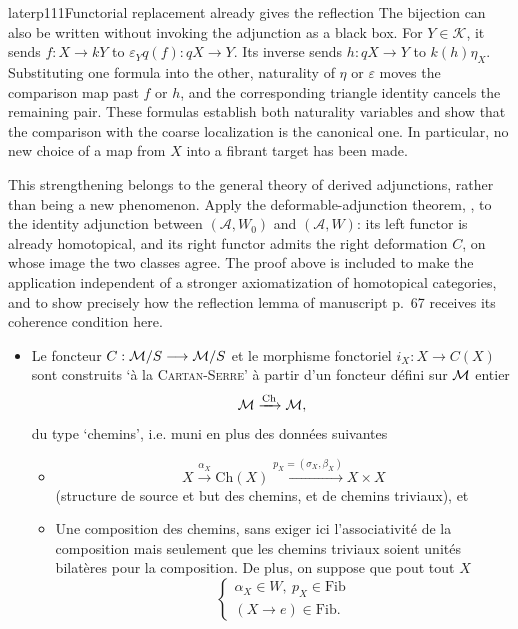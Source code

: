 \begin{dcomment}{later}{p111}{Functorial replacement already gives the reflection}
The bijection can also be written without invoking the adjunction as a black box. For $Y\in\mathcal K$, it sends $f:X\to kY$ to $\varepsilon_Yq(f):qX\to Y$. Its inverse sends $h:qX\to Y$ to $k(h)\eta_X$. Substituting one formula into the other, naturality of $\eta$ or $\varepsilon$ moves the comparison map past $f$ or $h$, and the corresponding triangle identity cancels the remaining pair. These formulas establish both naturality variables and show that the comparison with the coarse localization is the canonical one. In particular, no new choice of a map from $X$ into a fibrant target has been made.

This strengthening belongs to the general theory of derived adjunctions, rather than being a new phenomenon. Apply the deformable-adjunction theorem, \citet[Theorem~2.2.11]{Riehl2014}, to the identity adjunction between $(\mathcal A,W_0)$ and $(\mathcal A,W)$: its left functor is already homotopical, and its right functor admits the right deformation $C$, on whose image the two classes agree. The proof above is included to make the application independent of a stronger axiomatization of homotopical categories, and to show precisely how the reflection lemma of manuscript p.~67 receives its coherence condition here.
\end{dcomment}


\begin{itemize}[leftmargin=3em]
\item[A$'$)] Le foncteur $C : \mathcal{M}/S \longrightarrow \mathcal{M}/S$ et le morphisme fonctoriel $i_X : X \longrightarrow C(X)$ sont construits ‘à la \textsc{Cartan-Serre}’ à partir d'un foncteur défini sur $\mathcal{M}$ entier
\[\mathcal{M} \xrightarrow{\mathrm{Ch}} \mathcal{M},\]
du type ‘chemins’, i.e. muni en plus des données suivantes
\begin{itemize}[leftmargin=3em]
\item[a)] \[X \xrightarrow{\alpha_X} \mathrm{Ch}(X) \xrightarrow{p_X = (\sigma_X, \beta_X)} X \times X\]
(structure de source et but des chemins, et de chemins triviaux), et
\item[b)] Une composition des chemins, sans exiger ici l'associativité de la composition mais seulement que les chemins triviaux soient unités bilatères pour la composition. De plus, on suppose que pout tout $X$ %
\[\begin{cases} \alpha_X \in W,\ p_X \in \mathrm{Fib} \\ (X \longrightarrow e) \in \mathrm{Fib}. \end{cases}\]
\end{itemize}
\end{itemize}


